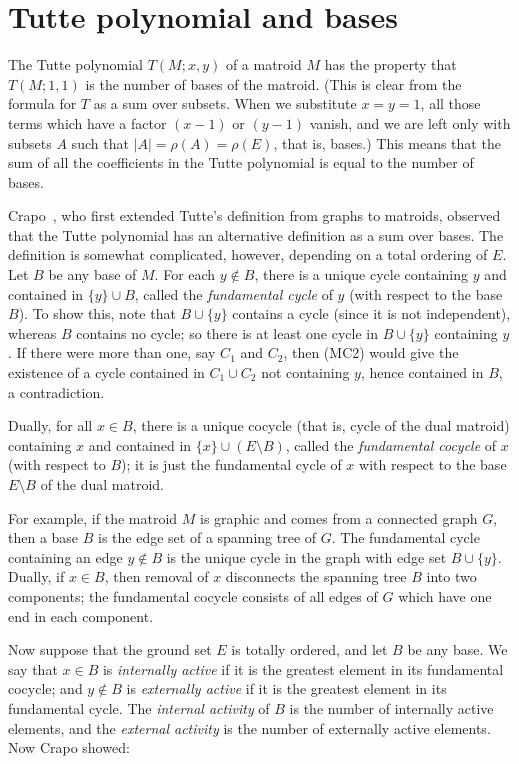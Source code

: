 \documentclass[12pt]{article}
\begin{document}
\section{Tutte polynomial and bases}

The Tutte polynomial $T(M;x,y)$ of a matroid $M$ has the property
that $T(M;1,1)$ is the number of bases of the matroid. (This is clear
from the formula for $T$ as a sum over subsets. When we substitute
$x=y=1$, all those terms which have a factor $(x-1)$ or $(y-1)$ vanish,
and we are left only with subsets $A$ such that $|A|=\rho(A)=\rho(E)$,
that is, bases.) This means that the sum of all the coefficients in
the Tutte polynomial is equal to the number of bases.

Crapo~\cite{crapo}, who first extended Tutte's definition from graphs
to matroids, observed that the Tutte polynomial has an alternative
definition as a sum over bases. The definition is somewhat complicated,
however, depending on a total ordering of $E$. Let $B$ be any base of $M$.
For each $y\notin B$, there is a unique cycle containing $y$ and contained
in $\{y\}\cup B$, called the \textit{fundamental cycle} of $y$ (with
respect to the base $B$). To show this, note that $B\cup\{y\}$ contains
a cycle (since it is not independent), whereas $B$ contains no cycle; so
there is at least one cycle in $B\cup\{y\}$ containing $y$. If there
were more than one, say $C_1$ and $C_2$, then (MC2) would give the existence
of a cycle contained in $C_1\cup C_2$ not containing $y$, hence contained
in $B$, a contradiction.

Dually, for all $x\in B$, there is a unique
cocycle (that is, cycle of the dual matroid) containing $x$ and contained
in $\{x\}\cup(E\setminus B)$, called the \textit{fundamental cocycle}
of $x$ (with respect to $B$); it is just the fundamental cycle of $x$
with respect to the base $E\setminus B$ of the dual matroid.

For example, if the matroid $M$ is graphic and comes from a connected
graph $G$, then a base $B$ is the edge set of a spanning tree of $G$.
The fundamental cycle containing an edge $y\notin B$ is the unique
cycle in the graph with edge set $B\cup\{y\}$. Dually, if $x\in B$,
then removal of $x$ disconnects the spanning tree $B$ into two
components; the fundamental cocycle consists of all edges of $G$ which
have one end in each component.

Now suppose that the ground set $E$ is totally ordered, and let $B$ be
any base. We say that $x\in B$ is \textit{internally active} if it is
the greatest element in its fundamental cocycle; and $y\notin B$ is
\textit{externally active} if it is the greatest element in its
fundamental cycle. The \textit{internal activity} of $B$ is the number
of internally active elements, and the \textit{external activity} is
the number of externally active elements. Now Crapo showed:
\end{document}
